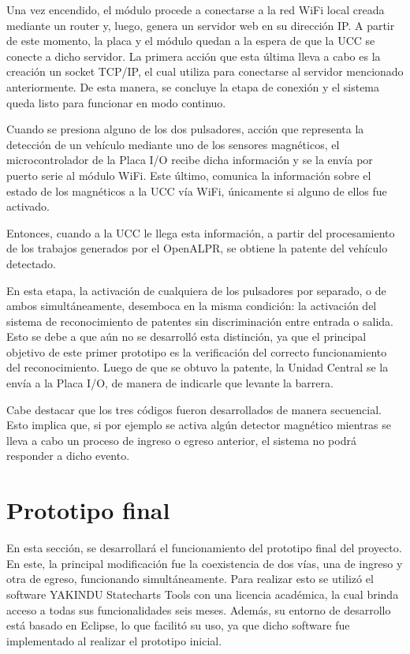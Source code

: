 Una vez encendido, el módulo procede a conectarse a la red WiFi local creada mediante un router y, luego, genera un servidor web en su dirección IP. A partir de este momento, la placa y el módulo quedan a la espera de que la UCC se conecte a dicho servidor. La primera acción que esta última lleva a cabo es la creación un socket TCP/IP, el cual utiliza para conectarse al servidor mencionado anteriormente. De esta manera, se concluye la etapa de conexión y el sistema queda listo para funcionar en modo continuo.

Cuando se presiona alguno de los dos pulsadores, acción que representa la detección de un vehículo mediante uno de los sensores magnéticos, el microcontrolador de la Placa I/O recibe dicha información y se la envía por puerto serie al módulo WiFi. Este último, comunica la información sobre el estado de los magnéticos a la UCC vía WiFi, únicamente si alguno de ellos fue activado. 

Entonces, cuando a la UCC le llega esta información, a partir del procesamiento de los trabajos generados por el OpenALPR, se obtiene la patente del vehículo detectado.

En esta etapa, la activación de cualquiera de los pulsadores por separado, o de ambos simultáneamente, desemboca en la misma condición: la activación del sistema de reconocimiento de patentes sin discriminación entre entrada o salida. Esto se debe a que aún no se desarrolló esta distinción, ya que el principal objetivo de este primer prototipo es la verificación del correcto funcionamiento del reconocimiento. Luego de que se obtuvo la patente, la Unidad Central se la envía a la Placa I/O, de manera de indicarle que levante la barrera.

Cabe destacar que los tres códigos fueron desarrollados de manera secuencial. Esto implica que, si por ejemplo se activa algún detector magnético mientras se lleva a cabo un proceso de ingreso o egreso anterior, el sistema no podrá responder a dicho evento.



\section{Prototipo final}

En esta sección, se desarrollará el funcionamiento del prototipo final del proyecto. En este, la principal modificación fue la coexistencia de dos vías, una de ingreso y otra de egreso, funcionando simultáneamente. Para realizar esto se utilizó el software YAKINDU Statecharts Tools \cite{yakinduprincipalpage} con una licencia académica, la cual brinda acceso a todas sus funcionalidades seis meses. Además, su entorno de desarrollo está basado en Eclipse, lo que facilitó su uso, ya que dicho software fue implementado al realizar el prototipo inicial.

